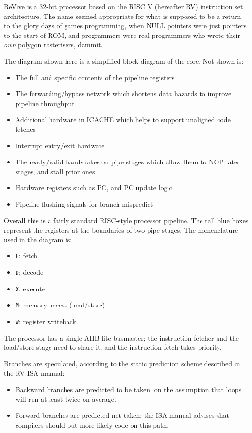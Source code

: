 \documentclass{article}
\begin{document}
ReVive is a 32-bit processor based on the RISC V (hereafter RV) instruction set architecture. The name seemed appropriate for what is supposed to be a return to the glory days of games programming, when NULL pointers were just pointers to the start of ROM, and programmers were real programmers who wrote their \textit{own} polygon rasterisers, dammit.

The diagram shown here is a simplified block diagram of the core. Not shown is:
\begin{itemize}
\item The full and specific contents of the pipeline registers
\item The forwarding/bypass network which shortens data hazards to improve pipeline throughput
\item Additional hardware in ICACHE which helps to support unaligned code fetches
\item Interrupt entry/exit hardware
\item The ready/valid handshakes on pipe stages which allow them to NOP later stages, and stall prior ones
\item Hardware registers such as PC, and PC update logic
\item Pipeline flushing signals for branch mispredict
\end{itemize}

Overall this is a fairly standard RISC-style processor pipeline. The tall blue boxes represent the registers at the boundaries of two pipe stages. The nomenclature used in the diagram is:

\begin{itemize}
\item \texttt{F}: fetch
\item \texttt{D}: decode
\item \texttt{X}: execute
\item \texttt{M}: memory access (load/store)
\item \texttt{W}: register writeback
\end{itemize}

The processor has a single AHB-lite busmaster; the instruction fetcher and the load/store stage need to share it, and the instruction fetch takes priority.

Branches are speculated, according to the static prediction scheme described in the RV ISA manual:

\begin{itemize}
\item Backward branches are predicted to be taken, on the assumption that loops will run at least twice on average.
\item Forward branches are predicted not taken; the ISA manual advises that compilers should put more likely code on this path.
\end{itemize}
\end{document}
